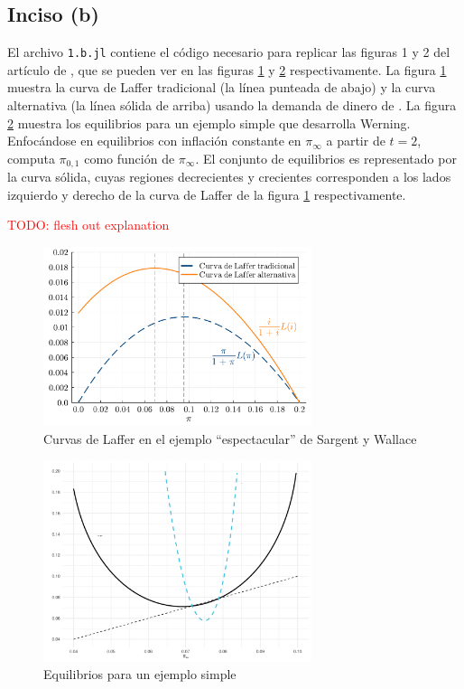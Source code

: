\documentclass[../../entrega.tex]{subfiles}
\begin{document}
\subsection{Inciso (b)}
El archivo \texttt{1.b.jl} contiene el código necesario para replicar las figuras 1 y 2 del artículo de \textcite{werning_recalculating_2024}, que se pueden ver en las figuras \ref{fig:figure1} y \ref{fig:figure2} respectivamente.
La figura \ref{fig:figure1} muestra la curva de Laffer tradicional (la línea punteada de abajo) y la curva alternativa (la línea sólida de arriba) usando la demanda de dinero de \textcite{sargent_unpleasant_1981}.
La figura \ref{fig:figure2} muestra los equilibrios para un ejemplo simple que desarrolla Werning.
Enfocándose en equilibrios con inflación constante en $\pi_\infty$ a partir de $t = 2$, computa $\pi_{0, 1}$ como función de $\pi_\infty$.
El conjunto de equilibrios es representado por la curva sólida, cuyas regiones decrecientes y crecientes corresponden a los lados izquierdo y derecho de la curva de Laffer de la figura \ref{fig:figure1} respectivamente.

\textcolor{red}{TODO: flesh out explanation}

\begin{figure}[!htb]
    \centering
    \includegraphics[width=0.7\textwidth]{figure1.pdf}
    \caption{Curvas de Laffer en el ejemplo ``espectacular'' de Sargent y Wallace}
    \label{fig:figure1}
\end{figure}
\begin{figure}[!htb]
    \centering
    \includegraphics[width=0.7\textwidth]{figure2.pdf}
    \caption{Equilibrios para un ejemplo simple}
    \label{fig:figure2}
\end{figure}
\FloatBarrier
\end{document}
